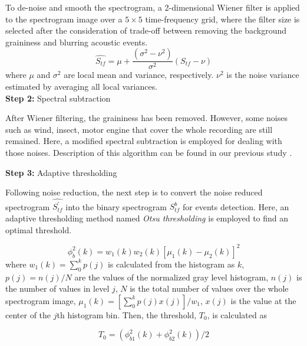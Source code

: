 \noindent To de-noise and smooth the spectrogram, a 2-dimensional Wiener filter is applied to the spectrogram image over a $5 \times 5$ time-frequency grid, where the filter size is selected after the consideration of trade-off between removing the background graininess and blurring acoustic events.
\begin{equation}
\hat{S_{tf}} = \mu + \frac{(\sigma^{2}-\nu^{2})}{\sigma^{2}}(S_{tf}-\nu)
\end{equation}
where $\mu$ and $\sigma^{2}$ are local mean and variance, respectively. $\nu^{2}$ is the noise variance estimated by averaging all local variances. 
\\
\textbf{Step 2:} Spectral subtraction

\noindent After Wiener filtering, the graininess has been removed. However, some noises such as wind, insect, motor engine that cover the whole recording are still remained. Here, a modified spectral subtraction is employed for dealing with those noises. Description of this algorithm can be found in our previous study \cite{Xie2016}.

\noindent \textbf{Step 3:} Adaptive thresholding

\noindent Following noise reduction, the next step is to convert the noise reduced spectrogram $\hat{S^{'}_{tf}}$ into the binary spectrogram $S^{b}_{tf}$ for events detection. Here, an adaptive thresholding method named \textit{Otsu thresholding} \cite{otsu1975threshold} is employed to find an optimal threshold.

\begin{equation}
\phi_{b}^{2}(k)=w_{1}(k)w_{2}(k)[\mu_{1}(k)-\mu_{2}(k)]^{2}
\end{equation}
\noindent where $w_{1}(k)=\sum_{0}^{k}p(j)$ is calculated from the histogram as $k$, $p(j)=n(j)/N$ are the values of the normalized gray level histogram, $n(j)$ is the number of values in level $j$, $N$ is the total number of values over the whole spectrogram image, $\mu_{1}(k)=[\sum_{0}^{k}p(j)x(j)]/w_{1}$, $x(j)$ is the value at the center of the $j$th histogram bin. Then, the threshold, $T_{0}$, is calculated as

\begin{equation}
T_{0}= (\phi_{b1}^{2}(k) + \phi_{b2}^{2}(k)) / 2
\end{equation}

